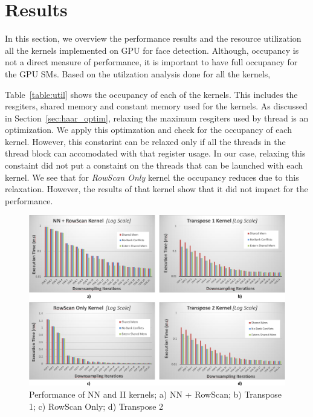 \section{Results}\label{sec:results}

In this section, we overview the performance results and the resource
utilization all the kernels implemented on GPU for face detection. 
Although, occupancy is not a direct measure of performance, it is important 
to have full occupancy for the GPU SMs. Based on the utilzation analysis done for all the kernels,

Table~\ref{table:util} shows the occupancy of each of the kernels. This includes the resgiters, 
shared memory and constant memory used for the kernels. As discussed in Section~\ref{sec:haar_optim}, 
relaxing the maximum resgiters used by thread is an optimization. We apply this optimzation and check for the 
occupancy of each kernel. 
However, this constarint can be relaxed only if all the threads in the thread block can accomodated with that register usage.
In our case, relaxing this constaint did not put a constaint on the threads that can be launched with each kernel.
We see that for \emph{RowScan Only} kernel the occupancy reduces due to this relaxation. However, the results of that kernel
show that it did not impact for the performance. 


\begin{figure}
  \centering
  \includegraphics[width=\linewidth]{figs/nn_ii_kernels_crop.pdf}
  \caption{Performance of NN and II kernels; a) NN + RowScan; b) Transpose 1; c) RowScan Only; d) Transpose 2}
  \label{fig:nn_ii_kernels}
\end{figure}

